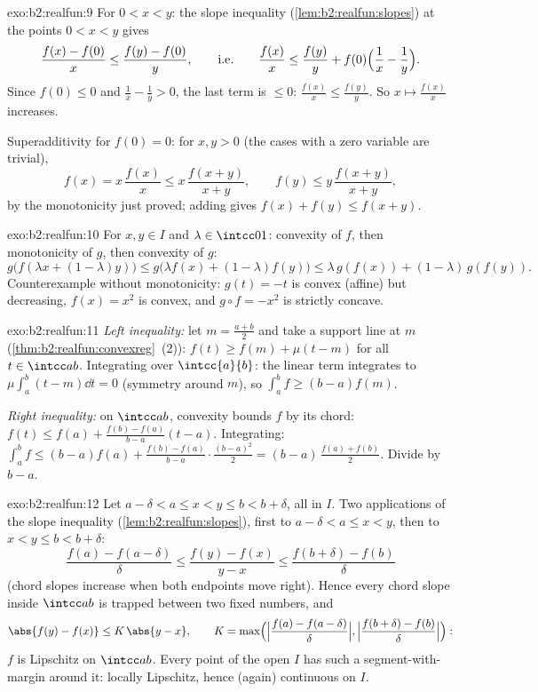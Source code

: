 \begin{solution}{exo:b2:realfun:9}
For $0 < x < y$: the slope inequality
(\cref{lem:b2:realfun:slopes}) at the points $0 < x < y$ gives
\[
\frac{f(x) - f(0)}{x} \leq \frac{f(y) - f(0)}{y},
\qquad\text{i.e.}\qquad
\frac{f(x)}{x} \leq \frac{f(y)}{y} +
f(0)\Bigl(\frac1x - \frac1y\Bigr).
\]
Since $f(0) \leq 0$ and $\frac1x - \frac1y > 0$, the last term is
$\leq 0$: $\frac{f(x)}{x} \leq \frac{f(y)}{y}$. So $x \mapsto
\frac{f(x)}x$ increases.

Superadditivity for $f(0) = 0$: for $x, y > 0$ (the cases with a
zero variable are trivial),
\[
f(x) = x\,\frac{f(x)}{x} \leq x\,\frac{f(x+y)}{x+y},
\qquad
f(y) \leq y\,\frac{f(x+y)}{x+y},
\]
by the monotonicity just proved; adding gives $f(x) + f(y) \leq
f(x+y)$.
\end{solution}

\begin{solution}{exo:b2:realfun:10}
For $x, y \in I$ and $\lambda \in \intcc01$: convexity of $f$,
then monotonicity of $g$, then convexity of $g$:
\[
g\bigl(f(\lambda x + (1{-}\lambda)y)\bigr)
\leq g\bigl(\lambda f(x) + (1{-}\lambda)f(y)\bigr)
\leq \lambda\,g(f(x)) + (1{-}\lambda)\,g(f(y)).
\]
Counterexample without monotonicity: $g(t) = -t$ is convex
(affine) but decreasing, $f(x) = x^2$ is convex, and $g \circ f =
-x^2$ is strictly concave.
\end{solution}

\begin{solution}{exo:b2:realfun:11}
\emph{Left inequality:} let $m = \frac{a+b}2$ and take a support
line at $m$ (\cref{thm:b2:realfun:convexreg}~(2)): $f(t) \geq
f(m) + \mu(t - m)$ for all $t \in \intcc ab$. Integrating over
$\intcc{a}{b}$: the linear term integrates to $\mu\int_a^b(t -
m)\dd t = 0$ (symmetry around $m$), so $\int_a^b f \geq (b -
a)f(m)$.

\emph{Right inequality:} on $\intcc ab$, convexity bounds $f$ by
its chord: $f(t) \leq f(a) + \frac{f(b) - f(a)}{b - a}(t - a)$.
Integrating: $\int_a^b f \leq (b-a)f(a) + \frac{f(b) - f(a)}{b -
a}\cdot\frac{(b-a)^2}2 = (b - a)\,\frac{f(a) + f(b)}2$. Divide by
$b - a$.
\end{solution}

\begin{solution}{exo:b2:realfun:12}
Let $a - \delta < a \leq x < y \leq b < b + \delta$, all in $I$.
Two applications of the slope inequality
(\cref{lem:b2:realfun:slopes}), first to $a - \delta < a \leq x <
y$, then to $x < y \leq b < b + \delta$:
\[
\frac{f(a) - f(a - \delta)}{\delta}
\leq \frac{f(y) - f(x)}{y - x}
\leq \frac{f(b + \delta) - f(b)}{\delta}
\]
(chord slopes increase when both endpoints move right). Hence
every chord slope inside $\intcc ab$ is trapped between two fixed
numbers, and
\[
\abs{f(y) - f(x)} \leq K\,\abs{y - x},
\qquad
K = \max\Bigl(\Bigl|\frac{f(a) - f(a-\delta)}{\delta}\Bigr|,
\Bigl|\frac{f(b+\delta) - f(b)}{\delta}\Bigr|\Bigr):
\]
$f$ is Lipschitz on $\intcc ab$. Every point of the open $I$ has
such a segment-with-margin around it: locally Lipschitz, hence
(again) continuous on $I$.
\end{solution}

